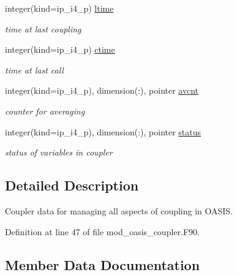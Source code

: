 \begin{DoxyCompactItemize}
integer(kind=ip\+\_\+i4\+\_\+p) \hyperlink{structmod__oasis__coupler_1_1prism__coupler__type_a5d93a8e5b39d3b713e8f1bf4760b10f9}{ltime}
\begin{DoxyCompactList}\small\item\em time at last coupling \end{DoxyCompactList}\item 
integer(kind=ip\+\_\+i4\+\_\+p) \hyperlink{structmod__oasis__coupler_1_1prism__coupler__type_a2fd551fc7c0ed06d43b2b3babfc8c34a}{ctime}
\begin{DoxyCompactList}\small\item\em time at last call \end{DoxyCompactList}\item 
integer(kind=ip\+\_\+i4\+\_\+p), dimension(\+:), pointer \hyperlink{structmod__oasis__coupler_1_1prism__coupler__type_accd8eb166c6aac75690be947dec43ccc}{avcnt}
\begin{DoxyCompactList}\small\item\em counter for averaging \end{DoxyCompactList}\item 
integer(kind=ip\+\_\+i4\+\_\+p), dimension(\+:), pointer \hyperlink{structmod__oasis__coupler_1_1prism__coupler__type_aee26373fa4a84f3c4e1841ba702f161c}{status}
\begin{DoxyCompactList}\small\item\em status of variables in coupler \end{DoxyCompactList}\end{DoxyCompactItemize}


\subsection{Detailed Description}
Coupler data for managing all aspects of coupling in O\+A\+S\+IS. 

Definition at line 47 of file mod\+\_\+oasis\+\_\+coupler.\+F90.



\subsection{Member Data Documentation}
\mbox{\label{structmod__oasis__coupler_1_1prism__coupler__type_accd8eb166c6aac75690be947dec43ccc}} 
